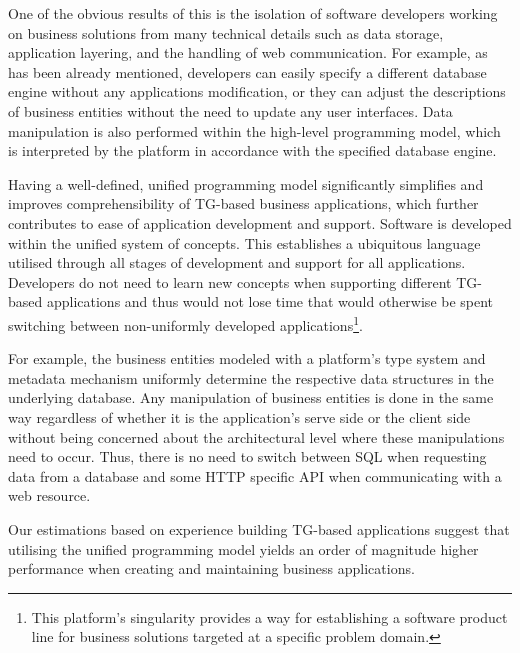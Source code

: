   One of the obvious results of this is the isolation of software developers working on business solutions from many technical details such as data storage, application layering, and the handling of web communication.
  For example, as has been already mentioned, developers can easily specify a different database engine without any applications modification, or they can adjust the descriptions of business entities without the need to update any user interfaces.
  Data manipulation is also performed within the high-level programming model, which is interpreted by the platform in accordance with the specified database engine.
  
  Having a well-defined, unified programming model significantly simplifies and improves comprehensibility of TG-based business applications, which further contributes to ease of application development and support.
  Software is developed within the unified system of concepts.
  This establishes a ubiquitous language utilised through all stages of development and support for all applications.
  Developers do not need to learn new concepts when supporting different TG-based applications and thus would not lose time that would otherwise be spent switching between non-uniformly developed applications\footnote{This platform's singularity provides a way for establishing a software product line for business solutions targeted at a specific problem domain.}.
  
  For example, the business entities modeled with a platform's type system and metadata mechanism uniformly determine the respective data structures in the underlying database.
  Any manipulation of business entities is done in the same way regardless of whether it is the application's serve side or the client side without being concerned about the architectural level where these manipulations need to occur.
  Thus, there is no need to switch between SQL when requesting data from a database and some HTTP specific API when communicating with a web resource.

  Our estimations based on experience building TG-based applications suggest that utilising the unified programming model yields an order of magnitude higher performance when creating and maintaining business applications.

